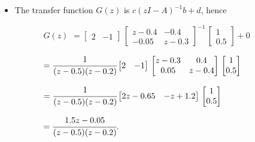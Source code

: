 \begin{frame}
\myPause
 \begin{itemize}[<+-| alert@+>]
 \item The transfer function $G(z)$ is $c(zI-A)^{-1}b+d$, hence
       \begin{itemize}
       \item[] \begin{itemize}[<+-| alert@+>]
               \item[$G(z)$] \vspace{1mm}
                    $= \begin{bmatrix} 2 & -1 \end{bmatrix} \,
                       \begin{bmatrix} z-0.4 & -0.4 \\
                       -0.05& z-0.3 \end{bmatrix}^{-1} \,
                       \begin{bmatrix} 1 \\ 0.5 \end{bmatrix}
                       +0
                    $
               \item[] \vspace{1mm}
                    $= \cfrac{1}{(z-0.5)(z-0.2)}
                       \begin{bmatrix} 2 & -1 \end{bmatrix} \,
                       \begin{bmatrix} z-0.3 & 0.4 \\
                       0.05& z-0.4 \end{bmatrix} \,
                       \begin{bmatrix} 1 \\ 0.5 \end{bmatrix}
                    $
               \item[] \vspace{1mm}
                    $= \cfrac{1}{(z-0.5)(z-0.2)}
                       \begin{bmatrix} 2z-0.65 &-z+1.2 \end{bmatrix} \,
                       \begin{bmatrix} 1 \\ 0.5 \end{bmatrix}
                    $
               \item[] \vspace{1mm}
                    $= \cfrac{1.5z-0.05}{(z-0.5)(z-0.2)}.
                    $
               \end{itemize}
       \end{itemize}
 \end{itemize}
\end{frame}

